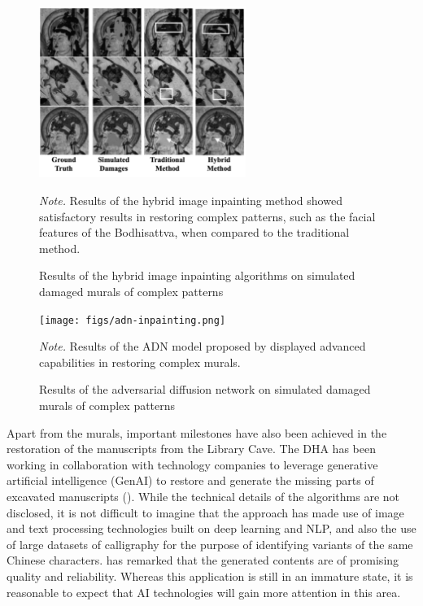 \begin{figure}
    \caption{Results of the hybrid image inpainting algorithms on simulated damaged murals of complex patterns}
    \label{fig:hybrid-image-inpainting}

    \begin{center}
        \includegraphics[width=0.6\textwidth]{figs/hybrid-method-inpainting.png}
    \end{center}

    \small\textit{Note.} Results of the hybrid image inpainting method showed satisfactory results in restoring
    complex patterns, such as the facial features of the Bodhisattva, when compared to the traditional method.
\end{figure}

\begin{figure}
    \caption{Results of the adversarial diffusion network on simulated damaged murals of complex patterns}
    \label{fig:adversarial-diffusion-inpainting}

    \begin{center}
        \texttt{[image: figs/adn-inpainting.png]}
    \end{center}

    \small\textit{Note.} Results of the ADN model proposed by 
    displayed advanced capabilities in restoring complex murals.
\end{figure}

Apart from the murals, important milestones have also been achieved in the restoration of the manuscripts from
the Library Cave. The DHA has been working in collaboration with technology companies to leverage generative
artificial intelligence (GenAI) to restore and generate the missing parts of excavated manuscripts
(). While the technical details of the algorithms are not
disclosed, it is not difficult to imagine that the approach has made use of image and text processing technologies
built on deep learning and NLP, and also the use of large datasets of calligraphy for the purpose of identifying
variants of the same Chinese characters.  has remarked that
the generated contents are of promising quality and reliability. Whereas this application is still in an immature
state, it is reasonable to expect that AI technologies will gain more attention in this area.

